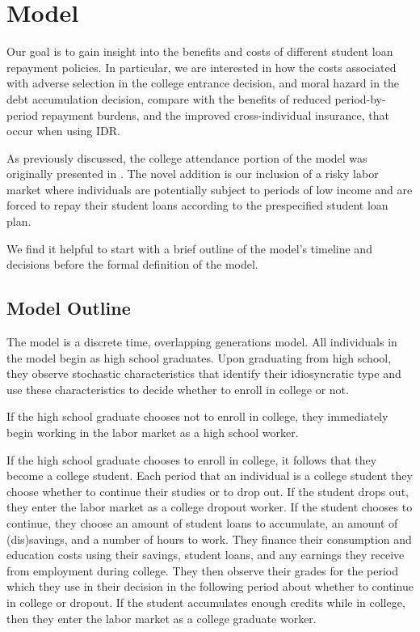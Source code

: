 
\section{Model} \label{sec:model}

Our goal is to gain insight into the benefits and costs of different student loan repayment
policies. In particular, we are interested in how the costs associated with adverse selection in the
college entrance decision, and moral hazard in the debt accumulation decision, compare with the
benefits of reduced period-by-period repayment burdens, and the improved cross-individual insurance,
that occur when using IDR.

As previously discussed, the college attendance portion of the model was originally presented in
\cite{HendricksLeukhina2017}. The novel addition is our inclusion of a risky labor market where
individuals are potentially subject to periods of low income and are forced to repay their student
loans according to the prespecified student loan plan.

We find it helpful to start with a brief outline of the model's timeline and decisions before
the formal definition of the model.


\subsection{Model Outline}

  The model is a discrete time, overlapping generations model. All individuals in the model begin as
  high school graduates. Upon graduating from high school, they observe stochastic characteristics
  that identify their idiosyncratic type and use these characteristics to decide whether to enroll
  in college or not.

  If the high school graduate chooses not to enroll in college, they immediately begin working in
  the labor market as a high school worker.

  If the high school graduate chooses to enroll in college, it follows that they become a college
  student. Each period that an individual is a college student they choose whether to continue their
  studies or to drop out. If the student drops out, they enter the labor market as a college dropout
  worker. If the student chooses to continue, they choose an amount of student loans to accumulate,
  an amount of (dis)savings, and a number of hours to work. They finance their consumption and
  education costs using their savings, student loans, and any earnings they receive from employment
  during college. They then observe their grades for the period which they use in their decision in
  the following period about whether to continue in college or dropout. If the student accumulates
  enough credits while in college, then they enter the labor market as a college graduate worker.

